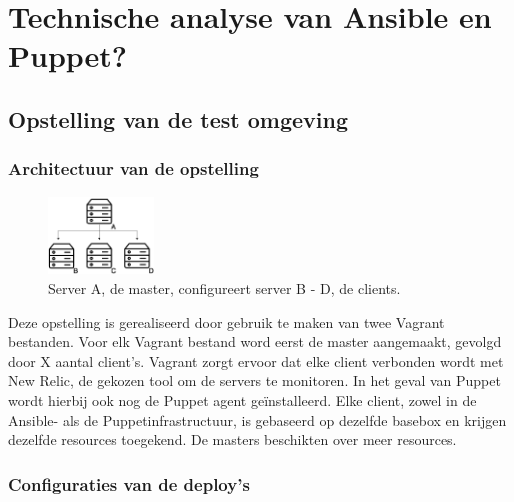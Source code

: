 
\section{Technische analyse van Ansible en Puppet?}
\label{sec:technischeanalyse}
\subsection{Opstelling van de test omgeving}
\label{sec:opstellingtestevn}
\subsubsection{Architectuur van de opstelling}

\begin{figure}
\centering
\includegraphics[width=0.25\textwidth]{img/infrastructruur.png}
\caption{\label{fig:infrastructuur} Server A, de master, configureert server B - D, de clients.}
\end{figure}


Deze opstelling is gerealiseerd door gebruik te maken van twee Vagrant bestanden. Voor elk Vagrant bestand word eerst de master aangemaakt, gevolgd door X aantal client's. Vagrant zorgt ervoor dat elke client  verbonden wordt met New Relic, de gekozen tool om de servers te monitoren. In het geval van Puppet wordt hierbij ook nog de Puppet agent ge\"installeerd. Elke client, zowel in de Ansible- als de Puppetinfrastructuur, is gebaseerd op dezelfde basebox en krijgen dezelfde resources toegekend. De masters beschikten over meer resources.\newline


\subsubsection{Configuraties van de deploy's}


